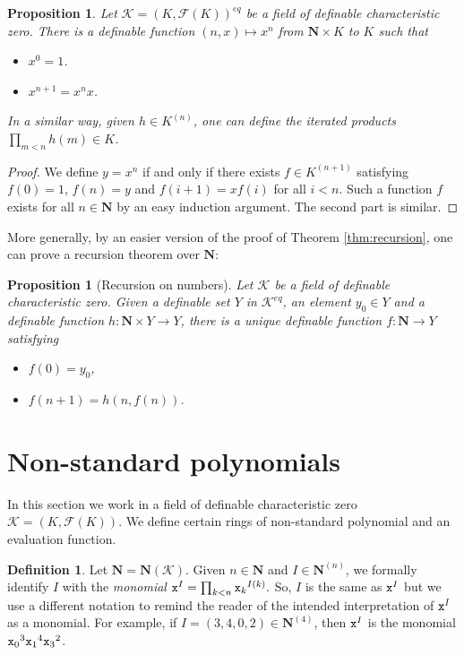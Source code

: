 \documentclass{amsart}
\newcommand{\ca}{\mathcal}
\theoremstyle{plain}
\newtheorem{prop}[thm]{Proposition}
\theoremstyle{definition}
\newtheorem{defn}[thm]{Definition}
\newcommand{\F}{\mathcal{F}}
\newcommand{\hn}{\mathbf N}
\begin{document}
\begin{prop}\label{prop:powers} Let $\ca K = (K,\F(K))^{eq}$ be a field of definable characteristic zero. There is a definable function $(n,x)\mapsto x^n$ from $\hn \times K$ to $K$ such that
\begin{itemize}
\item $x^0 = 1$. 
\item $x^{n+1} = x^n x$. 
\end{itemize}
In a similar way, given $h\in K^{(n)}$, one can define the iterated products $\prod_{m<n} h(m)\in K$. \end{prop}
\begin{proof}
We define $y = x^n$ if and only if there exists $f \in K^{(n+1)}$ satisfying $f(0) = 1$, $f(n) = y$ and $f(i+1) = x f(i)$ for all $i<n$. Such a function $f$ exists for all $n \in \hn$ by an easy induction argument. The second part is similar. 
\end{proof}

More generally, by an easier version of the proof of Theorem \ref{thm:recursion}, one can prove a recursion theorem over $\hn$: 

\begin{prop}[Recursion on numbers] \label{prop:recN} Let $\ca K$ be a field of definable characteristic zero. 
Given a definable set $Y$ in $\ca K^{eq}$, an element $y_0\in Y$ and a definable function $h:\hn \times Y \to Y$, 
there is a unique definable function $f: \hn \to Y$ satisfying
\begin{itemize}
\item $f(0) = y_0$, 
\item $f(n+1) = h(n,f(n))$.  
\end{itemize}
\end{prop}

\section{Non-standard polynomials}\label{sec:non-standard-poly}
In this section we work in a field of definable characteristic zero $\ca K = (K, \F(K))$. We define  certain rings of non-standard polynomial and an evaluation function.

\begin{defn}\label{defn:poly} Let $\hn = \hn(\ca K)$. Given $n\in \hn$ and $I\in \hn^{(n)}$, we formally identify $I$ with the {\em monomial} ${\tt x}^I = \prod_{k<n} {{\tt x}_k}^{I(k)}.$ So, $I$ is the same as ${\tt x}^I$ but we use a different notation to remind the reader of the intended interpretation of ${\tt x}^I$ as a monomial. For example, if $I = (3,4,0,2) \in \hn^{(4)}$, then ${\tt x}^I$ is the monomial ${{\tt x}_0}^3 {{\tt x}_1}^4 {{\tt x}_3}^2$.
\end{defn}
\end{document}
